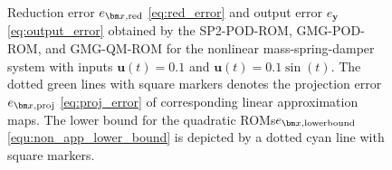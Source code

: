 \documentclass{article}
\newcommand{\statex}{{\bm x}}
\newcommand{\outputy}{{\bm y}}
\newcommand{\inputu}{\bm{u}}
\newcommand{\GMG}{\textsf{GMG}\xspace}
\newcommand{\QM}{\textsf{QM}\xspace} %
\newcommand{\POD}{\textsf{POD}\xspace}
\newcommand{\ROM}{\textsf{ROM}\xspace}
\newcommand{\ROMs}{\textsf{ROM}s\xspace}
\newcommand{\SPQuad}{\textsf{SP2}\xspace}
\newcommand\LineWidth{0.8pt}
\newcommand\MarkerSize{1.8pt}
\newcommand{\MarkerGMG}{triangle}
\newcommand{\MarkerGMGQM}{triangle}
\newcommand{\LineStyleGMG}{solid}
\newcommand{\ColorGMG}{teal}
\newcommand{\ColorGMGQM}{blue}
\begin{document}
\begin{figure}[htbp]
{
		}
		
	\caption{Reduction error $e_{\statex, {\rm red}}$ \eqref{eq:red_error} and output error $e_{\outputy}$ \eqref{eq:output_error} obtained by the \SPQuad-\POD-\ROM,  \GMG-\POD-\ROM, and \GMG-\QM-\ROM for the nonlinear mass-spring-damper system with inputs $\inputu(t) = 0.1$ and $\inputu(t)=0.1\sin(t)$. The dotted green lines with square markers denotes the projection error $e_{\statex, {\rm proj}}$ \eqref{eq:proj_error} of corresponding linear approximation maps. The lower bound for the quadratic \ROMs $e_{\statex,{\rm lowerbound}}$ \eqref{equ:non_app_lower_bound} is depicted by a dotted cyan line with square markers.
	}
		\label{fig:NL_MSD_time}
	\end{figure}	
	
\end{document}
